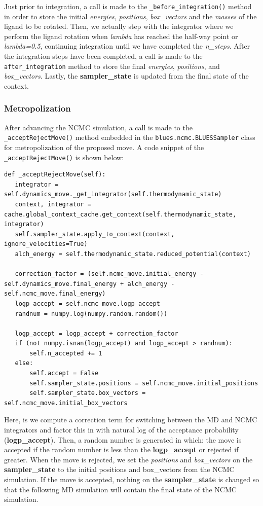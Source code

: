 Just prior to integration, a call is made to the \texttt{_before_integration()} method in order to store the initial \emph{energies}, \emph{positions}, \emph{box\_vectors} and the \emph{masses} of the ligand to be rotated.
Then, we actually step with the integrator where we perform the ligand rotation when \emph{lambda} has reached the half-way point or \emph{lambda=0.5}, continuing integration until we have completed the \emph{n\_steps}.
After the integration steps have been completed, a call is made to the \texttt{after_integration} method to store the final \emph{energies}, \emph{positions}, and \emph{box\_vectors}.
Lastly, the \textbf{sampler\_state} is updated from the final state of the context.


\subsubsection{Metropolization}

After advancing the NCMC simulation, a call is made to the \texttt{_acceptRejectMove()} method embedded in the \texttt{blues.ncmc.BLUESSampler} class for metropolization of the proposed move.
A code snippet of the \texttt{_acceptRejectMove()} is shown below:

\begin{verbatim}
def _acceptRejectMove(self):
   integrator = self.dynamics_move._get_integrator(self.thermodynamic_state)
   context, integrator = cache.global_context_cache.get_context(self.thermodynamic_state, integrator)
   self.sampler_state.apply_to_context(context, ignore_velocities=True)
   alch_energy = self.thermodynamic_state.reduced_potential(context)

   correction_factor = (self.ncmc_move.initial_energy - self.dynamics_move.final_energy + alch_energy - self.ncmc_move.final_energy)
   logp_accept = self.ncmc_move.logp_accept
   randnum = numpy.log(numpy.random.random())

   logp_accept = logp_accept + correction_factor
   if (not numpy.isnan(logp_accept) and logp_accept > randnum):
       self.n_accepted += 1
   else:
       self.accept = False
       self.sampler_state.positions = self.ncmc_move.initial_positions
       self.sampler_state.box_vectors = self.ncmc_move.initial_box_vectors
\end{verbatim}

Here, is we compute a correction term for switching between the MD and NCMC integrators and factor this in with natural log of the acceptance probability (\textbf{logp\_accept}).
Then, a random number is generated in which: the move is accepted if the random number is less than the \textbf{logp\_accept} or rejected if greater.
When the move is rejected, we set the \emph{positions} and \emph{box\_vectors} on the \textbf{sampler\_state} to the initial positions and box\_vectors from the NCMC simulation.
If the move is accepted, nothing on the \textbf{sampler\_state} is changed so that the following MD simulation will contain the final state of the NCMC simulation.

